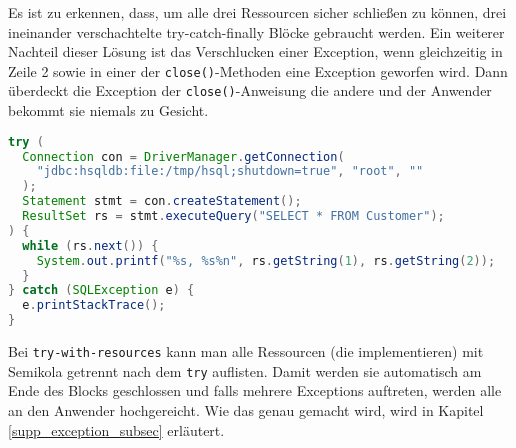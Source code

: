 \documentclass[times, 10pt,twocolumn]{article}
\begin{document}
Es ist zu erkennen, dass, um alle drei Ressourcen sicher schließen zu können, drei ineinander verschachtelte try-catch-finally Blöcke
gebraucht werden. Ein weiterer Nachteil dieser Lösung ist das Verschlucken einer Exception, wenn gleichzeitig in Zeile 2 sowie in einer
der \texttt{close()}-Methoden eine Exception geworfen wird. Dann überdeckt die Exception der \texttt{close()}-Anweisung die andere und der
Anwender bekommt sie niemals zu Gesicht.\cite{javainsel2}

\begin{lstlisting}[language=java,breaklines=true]
try (
  Connection con = DriverManager.getConnection(
	"jdbc:hsqldb:file:/tmp/hsql;shutdown=true", "root", ""
  );
  Statement stmt = con.createStatement();
  ResultSet rs = stmt.executeQuery("SELECT * FROM Customer");
) {
  while (rs.next()) {
	System.out.printf("%s, %s%n", rs.getString(1), rs.getString(2));
  }
} catch (SQLException e) {
  e.printStackTrace();
}
\end{lstlisting}

Bei \texttt{try-with-resources} kann man alle Ressourcen (die  implementieren) mit Semikola getrennt 
nach dem \texttt{try} auflisten. Damit werden sie automatisch am Ende des Blocks geschlossen und falls mehrere Exceptions auftreten,
werden alle an den Anwender hochgereicht. Wie das genau gemacht wird, wird in Kapitel \ref{supp_exception_subsec} erläutert. 




\label{supp_exception_subsec}



\end{document}
